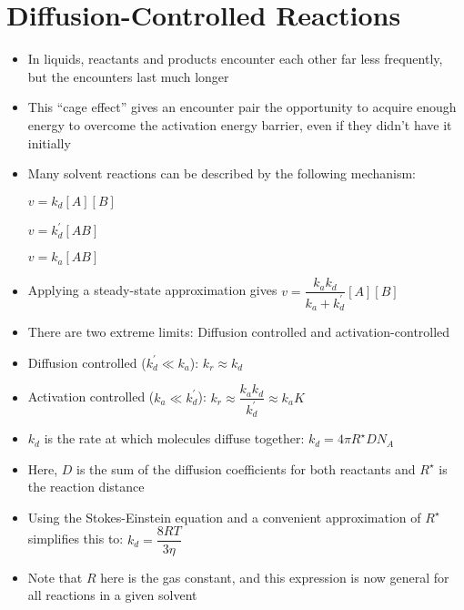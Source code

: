 \documentclass[12pt, openany, letterpaper]{memoir}
\begin{document}
\section{Diffusion-Controlled Reactions}
\begin{itemize}
	\item In liquids, reactants and products encounter each other far less frequently, but the encounters last much longer
	\item This “cage effect” gives an encounter pair the opportunity to acquire enough energy to overcome the activation energy barrier, even if they didn't have it initially
	\item Many solvent reactions can be described by the following mechanism:

	       \hspace{2em} $v=k_d[A][B]$

	       \hspace{2em} $v=k^\prime_d[AB]$

	       \hspace{2em} $v=k_a[AB]$
	\item Applying a steady-state approximation gives $v=\dfrac{k_ak_d}{k_a+k_d^\prime}[A][B]$
	\item There are two extreme limits: Diffusion controlled and activation-controlled
	\item Diffusion controlled ($k^\prime_d\ll k_a$): $k_r\approx k_d$
	\item Activation controlled ($k_a\ll k^\prime_d$): $k_r\approx\dfrac{k_ak_d}{k^\prime_d}\approx k_aK$
	\item $k_d$ is the rate at which molecules diffuse together: $k_d=4\pi R^{\star}DN_A$
	\item Here, $D$ is the sum of the diffusion coefficients for both reactants and $R^{\star}$ is the reaction distance
	\item Using the Stokes-Einstein equation and a convenient approximation of $R^{\star}$ simplifies this to: $k_d=\dfrac{8RT}{3\eta}$
	\item Note that $R$ here is the gas constant, and this expression is now general for all reactions in a given solvent
\end{itemize}
\end{document}
